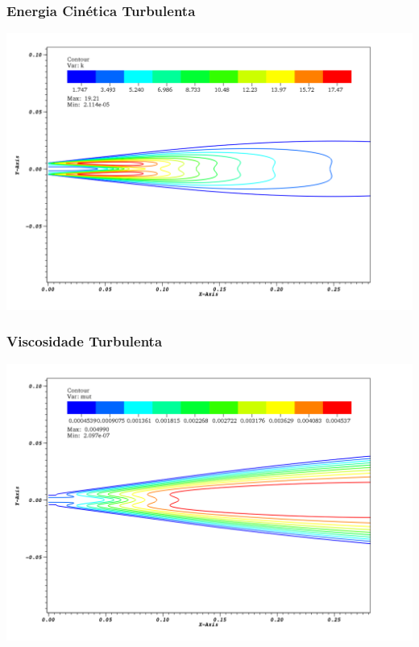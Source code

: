 \documentclass[bars,mathserif]{beamer}
\begin{document}
%
\begin{frame}[plain]
\frametitle{Energia Cinética Turbulenta}
\includegraphics[width=\textwidth]{./imgs/visit/k.png}
\end{frame}
%
\begin{frame}[plain]
\frametitle{Viscosidade Turbulenta}
\includegraphics[width=\textwidth]{./imgs/visit/mut.png}
\end{frame}
%
\end{document}
